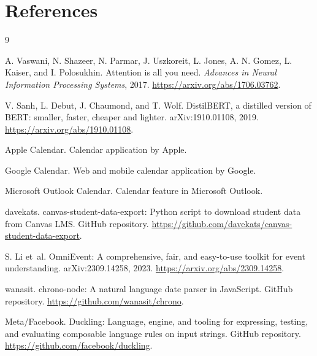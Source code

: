 \documentclass[final]{article}
\begin{document}
\newpage
\section*{References}
\begin{thebibliography}{9}

A. Vaswani, N. Shazeer, N. Parmar, J. Uszkoreit, L. Jones, A. N. Gomez, L. Kaiser, and I. Polosukhin.
\newblock Attention is all you need.
\newblock \emph{Advances in Neural Information Processing Systems}, 2017.
\newblock \url{https://arxiv.org/abs/1706.03762}.

V. Sanh, L. Debut, J. Chaumond, and T. Wolf.
\newblock DistilBERT, a distilled version of BERT: smaller, faster, cheaper and lighter.
\newblock arXiv:1910.01108, 2019.
\newblock \url{https://arxiv.org/abs/1910.01108}.

Apple Calendar.
\newblock Calendar application by Apple.

Google Calendar.
\newblock Web and mobile calendar application by Google.

Microsoft Outlook Calendar.
\newblock Calendar feature in Microsoft Outlook.

davekats.
\newblock canvas-student-data-export: Python script to download student data from Canvas LMS.
\newblock GitHub repository.
\newblock \url{https://github.com/davekats/canvas-student-data-export}.

S. Li et~al.
\newblock OmniEvent: A comprehensive, fair, and easy-to-use toolkit for event understanding.
\newblock arXiv:2309.14258, 2023.
\newblock \url{https://arxiv.org/abs/2309.14258}.

wanasit.
\newblock chrono-node: A natural language date parser in JavaScript.
\newblock GitHub repository.
\newblock \url{https://github.com/wanasit/chrono}.

Meta/Facebook.
\newblock Duckling: Language, engine, and tooling for expressing, testing, and evaluating composable language rules on input strings.
\newblock GitHub repository.
\newblock \url{https://github.com/facebook/duckling}.

\end{thebibliography}
\end{document}
